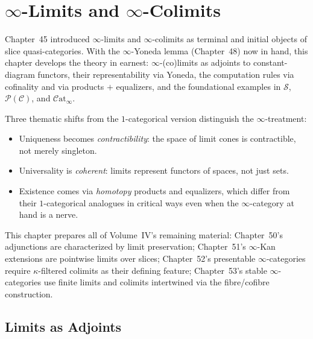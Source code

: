 
\chapter{$\infty$-Limits and $\infty$-Colimits}

\begin{overviewbox}
Chapter~45 introduced $\infty$-limits and $\infty$-colimits as terminal
and initial objects of slice quasi-categories. With the $\infty$-Yoneda
lemma (Chapter~48) now in hand, this chapter develops the theory in
earnest: $\infty$-(co)limits as adjoints to constant-diagram functors,
their representability via Yoneda, the computation rules via cofinality
and via products $+$ equalizers, and the foundational examples in
$\mathcal{S}$, $\mathcal{P}(\mathcal{C})$, and $\mathcal{C}\mathrm{at}_\infty$.

Three thematic shifts from the $1$-categorical version distinguish the
$\infty$-treatment:
\begin{itemize}
  \item Uniqueness becomes \emph{contractibility}: the space of limit
        cones is contractible, not merely singleton.
  \item Universality is \emph{coherent}: limits represent functors of
        spaces, not just sets.
  \item Existence comes via \emph{homotopy} products and equalizers,
        which differ from their $1$-categorical analogues in critical
        ways even when the $\infty$-category at hand is a nerve.
\end{itemize}

This chapter prepares all of Volume~IV's remaining material: Chapter~50's
adjunctions are characterized by limit preservation; Chapter~51's
$\infty$-Kan extensions are pointwise limits over slices; Chapter~52's
presentable $\infty$-categories require $\kappa$-filtered colimits as
their defining feature; Chapter~53's stable $\infty$-categories use
finite limits and colimits intertwined via the fibre/cofibre construction.
\end{overviewbox}


\section{Limits as Adjoints}
\label{sec:limits-adjoints}

